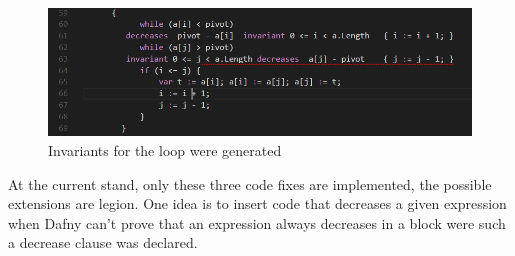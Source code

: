  \begin{figure}[H]
	\centering
	\includegraphics[width=1\textwidth]{img/indexChecked}
	\caption{Invariants for the loop were generated}
	\label{fig:indexInBound}
\end{figure}
At the current stand, only these three code fixes are implemented, the possible extensions are legion. One idea is to insert code that decreases a given expression when Dafny can't prove that an expression always decreases in a block were such a decrease clause was declared.\newline
